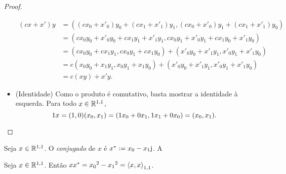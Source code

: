 \begin{proof}
\begin{itemize}
		\begin{align*}
		(cx+x')y &= ((cx_0+x'_0)y_0 + (cx_1+x'_1)y_1, (cx_0+x'_0)y_1 + (cx_1+x'_1)y_0) \\
			&= (cx_0y_0+x'_0y_0 + cx_1y_1+x'_1y_1, cx_0y_1+x'_0y_1 + cx_1y_0+x'_1y_0) \\
			&= (cx_0y_0+cx_1y_1, cx_0y_1+cx_1y_0) + (x'_0y_0+x'_1y_1, x'_0y_1+x'_1y_0) \\
			&= c(x_0y_0+x_1y_1, x_0y_1+x_1y_0) + (x'_0y_0+x'_1y_1, x'_0y_1+x'_1y_0) \\
			&= c(xy) + x'y.
		\end{align*}
	\item (Identidade) Como o produto é comutativo, basta mostrar a identidade à esquerda. Para todo $x \in \mathbb{R}^{1,1}$,
		\begin{equation*}
		1x = (1,0)(x_0,x_1) = (1x_0+0x_1, 1x_1+0x_0) = (x_0, x_1).
		\qedhere
		\end{equation*}
\end{itemize}
\end{proof}

\begin{definition}
Seja $x \in \mathbb{R}^{1,1}$. O \emph{conjugado} de $x$ é ${x}^* := x_0 - x_1\mathrm{j}$. A 
\end{definition}

\begin{exercise}
Seja $x \in \mathbb{R}^{1,1}$. Então $x{x}^* = {x_0}^2 - {x_1}^2 = \left\langle{x},{x}\right\rangle_{1,1}$.
\end{exercise}




